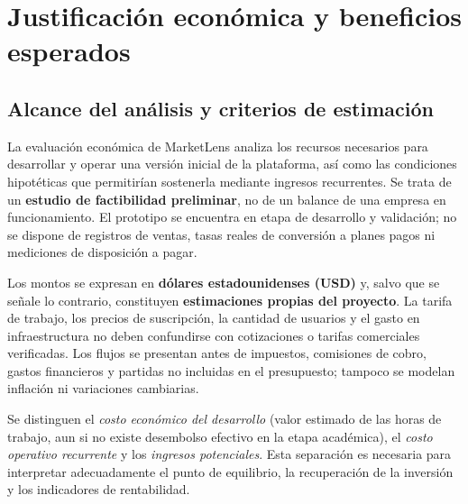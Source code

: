 
\chapter{Justificación económica y beneficios esperados}\label{cap:economica}

\section{Alcance del análisis y criterios de estimación}\label{sec:ml-economia-alcance}

La evaluación económica de MarketLens analiza los recursos necesarios para desarrollar y operar una versión inicial de la plataforma, así como las condiciones hipotéticas que permitirían sostenerla mediante ingresos recurrentes. Se trata de un \textbf{estudio de factibilidad preliminar}, no de un balance de una empresa en funcionamiento. El prototipo se encuentra en etapa de desarrollo y validación; no se dispone de registros de ventas, tasas reales de conversión a planes pagos ni mediciones de disposición a pagar.

Los montos se expresan en \textbf{dólares estadounidenses (USD)} y, salvo que se señale lo contrario, constituyen \textbf{estimaciones propias del proyecto}. La tarifa de trabajo, los precios de suscripción, la cantidad de usuarios y el gasto en infraestructura no deben confundirse con cotizaciones o tarifas comerciales verificadas. Los flujos se presentan antes de impuestos, comisiones de cobro, gastos financieros y partidas no incluidas en el presupuesto; tampoco se modelan inflación ni variaciones cambiarias.

Se distinguen el \textit{costo económico del desarrollo} (valor estimado de las horas de trabajo, aun si no existe desembolso efectivo en la etapa académica), el \textit{costo operativo recurrente} y los \textit{ingresos potenciales}. Esta separación es necesaria para interpretar adecuadamente el punto de equilibrio, la recuperación de la inversión y los indicadores de rentabilidad.

